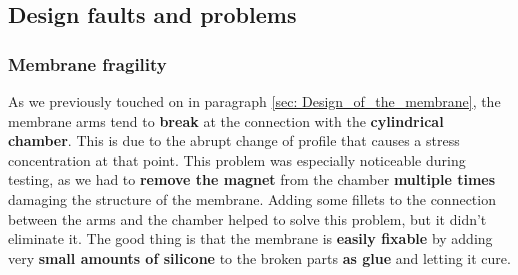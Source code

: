 \subsection{Design faults and problems}

\subsubsection{Membrane fragility}
As we previously touched on in paragraph \ref{sec: Design_of_the_membrane}, the membrane arms tend to \textbf{break} at the connection with the \textbf{cylindrical chamber}.
This is due to the abrupt change of profile that causes a stress concentration at that point.
This problem was especially noticeable during testing, as we had to \textbf{remove the magnet} from the chamber \textbf{multiple times} damaging the structure of the membrane.
Adding some fillets to the connection between the arms and the chamber helped to solve this problem, but it didn't eliminate it.
The good thing is that the membrane is \textbf{easily fixable} by adding very \textbf{small amounts of silicone} to the broken parts \textbf{as glue} and letting it cure.

